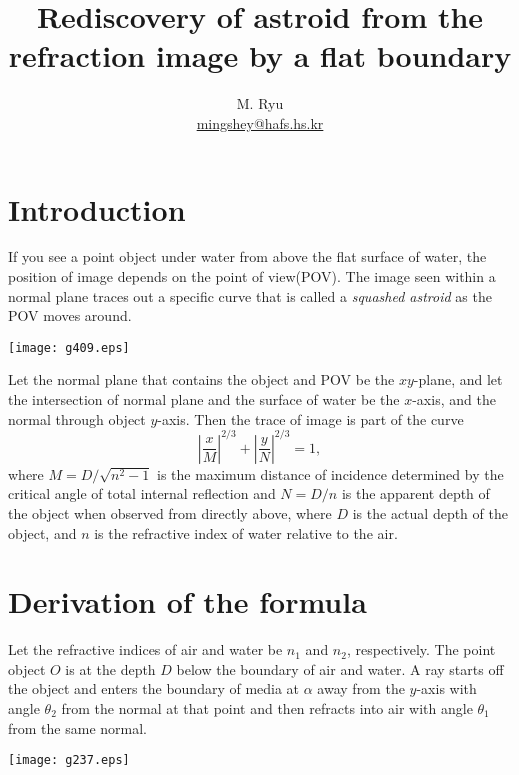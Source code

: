 \documentclass[twocolumn]{article}
\title{Rediscovery of astroid from the refraction image by a flat boundary}
\author{M. Ryu \\ {\href{mailto:mingshey@hafs.hs.kr}{mingshey@hafs.hs.kr}}}
\begin{document}
\maketitle
\section{Introduction}
If you see a point object under water from  above the flat surface of water, 
the position of image depends on the point of view(POV). The image seen
 within a normal plane traces out a specific curve that is called a  
 \emph{squashed astroid} as the POV moves around.

\texttt{[image: g409.eps]}

Let the normal plane that contains the object and  POV be the $xy$-plane,
 and let the intersection of  normal plane and the surface of water be the 
 $x$-axis, and the normal through  object $y$-axis. Then the trace of image 
 is part of the curve 
$$ \left| \dfrac{x}{M} \right| ^ {2/3} 
+ \left| \dfrac{y}{N} \right| ^ {2/3} = 1,$$
where $M = D/\sqrt{n^2 - 1}$ is the maximum distance of incidence
determined by the critical angle of total internal reflection and $N = D/n$ 
is the apparent depth of the object when observed from directly above, where
$D$ is the actual depth of the object, and $n$ is the refractive index of 
water relative to the air.

\section{Derivation of the formula}
Let the refractive indices  of air and water be $n_1$ and $n_2$, respectively. 
The point object $O$ is at the depth $D$ below the boundary of air and water. 
A ray starts off the object and enters the boundary of media at $\alpha$ away 
from the $y$-axis with angle $\theta_2$ from the normal at that point and then 
refracts into air with angle $\theta_1$ from the same normal.

\texttt{[image: g237.eps]}
\end{document}
